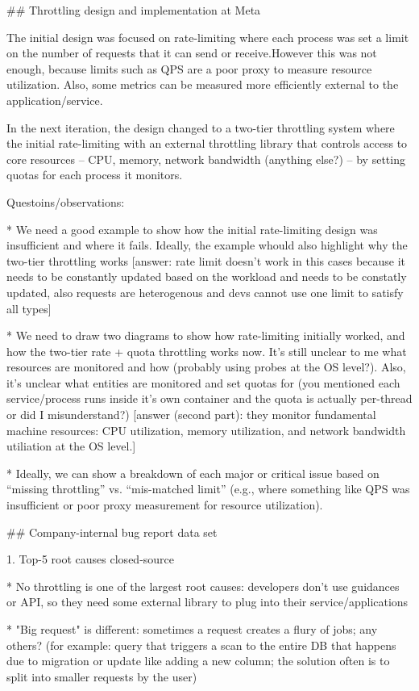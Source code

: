 ## Throttling design and implementation at Meta

The initial design was focused on rate-limiting where each process was set a limit on the number of requests that it can send or receive.However this was not enough, because limits such as QPS are a poor proxy to measure resource utilization. Also, some metrics can be measured more efficiently external to the application/service.

In the next iteration, the design changed to a two-tier throttling system where the initial rate-limiting with an external throttling library that controls access to core resources -- CPU, memory, network bandwidth (anything else?) -- by setting quotas for each process it monitors.

Questoins/observations:

* We need a good example to show how the initial rate-limiting design was insufficient and where it fails. Ideally, the example whould also highlight why the two-tier throttling works
[answer: rate limit doesn't work in this cases because it needs to be constantly updated based on the workload and needs to be constatly updated, also requests are heterogenous and devs cannot use one limit to satisfy all types]

* We need to draw two diagrams to show how rate-limiting initially worked, and how the two-tier rate + quota throttling works now. It's still unclear to me what resources are monitored and how (probably using probes at the OS level?). Also, it's unclear what entities are monitored and set quotas for (you mentioned each service/process runs inside it's own container and the quota is actually per-thread or did I misunderstand?)
[answer (second part): they monitor fundamental machine resources: CPU utilization, memory utilization, and network bandwidth utiliation at the OS level.]

* Ideally, we can show a breakdown of each major or critical issue based on ``missing throttling'' vs. ``mis-matched limit'' (e.g., where something like QPS was insufficient or poor proxy measurement for resource utilization).


## Company-internal bug report data set

1. Top-5 root causes closed-source

* No throttling is one of the largest root causes: developers don't use guidances or API, so they need some external library to plug into their service/applications

* "Big request" is different: sometimes a request creates a flury of jobs; any others? (for example: query that triggers a scan to the entire DB that happens due to migration or update like adding a new column; the solution often is to split into smaller requests by the user)

